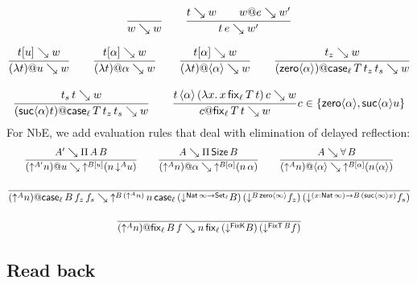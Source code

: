 \documentclass[acmlarge,review,anonymous]{acmart}\settopmatter{printfolios=true}
\begin{document}
\vspace{-4ex}
\begin{gather*}
  \ru{}{w \evalsto w}
\qquad
  \ru{t \evalsto w \qquad w @ e \evalsto w'}{t\,e \evalsto w'}
\end{gather*}


\begin{gather*}
  \ru{t[u] \evalsto w
    }{(\lambda t) @ u \evalsto w}
\qquad
  \ru{t[\alpha] \evalsto w
    }{(\lambda t) @ \alpha \evalsto w}
\qquad
  \ru{t[\alpha] \evalsto w
    }{(\lambda t) @ \ann \alpha \evalsto w}
\qquad
  \ru{t_z \evalsto w
    }{(\zero \alpha) @ \casett \evalsto w}
\\[2ex]
  \ru{t_s\, t \evalsto w
    }{(\suc \alpha t) @ \casett \evalsto w}
\qquad
  \ru{t\,\ann \alpha\,(\lambda x.\, x\, \fixtt)\,c \evalsto w
     }{c @ \fixtt \evalsto w
     }{c\in \{ \zero \alpha, \suc \alpha u \}}
\end{gather*}
For NbE, we add evaluation rules that deal with elimination of delayed reflection:
\begin{gather*}
  \ru{A' \evalsto \piT A B
    }{(\up {A'} n) @ u \evalsto \up{B[u]} (n \, \down A u) }
\qquad
  \ru{A \evalsto \piT \Size B
    }{(\up {A} n) @ \alpha \evalsto \up{B[\alpha]} (n \, \alpha)}
\qquad
  \ru{A \evalsto \forallT B
    }{(\up {A} n) @ \ann \alpha \evalsto \up{B[\alpha]} (n \ann \alpha)}
\\[2ex]
  \ru{%
    }{(\up {A} n) @ \case[\ell] B {f_z} {f_s} \evalsto
      \up{B\,(\up{A} n)}\,
         n\,\case[\ell]
             {(\down {\Nat \infty \to \Set[\ell]} B)}
             {(\down {B\,{\zero\infty}} f_z)}
             {(\down {\funS x {\Nat \infty} B\,(\suc \infty x)} f_s)}
    }
\\[2ex]
  \ru{%
    }{(\up {A} n) @ \fix[\ell] B f \evalsto
      n\,\fix[\ell] {(\down {\FixK} B)} {(\down {\FixT\, B} f)}
    }
\end{gather*}

\subsection{Read back}
\label{sec:read}
\end{document}
